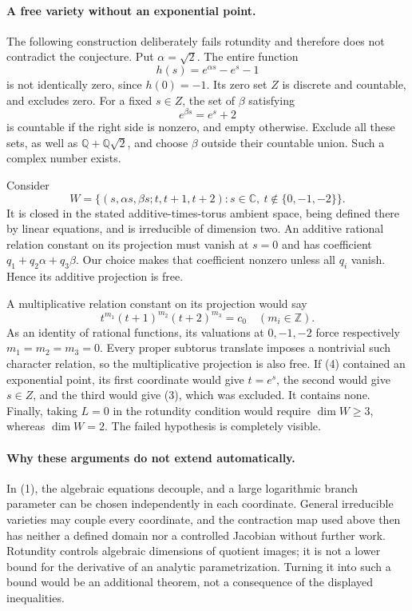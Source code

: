 \documentclass[11pt]{article}
\begin{document}
\paragraph{A free variety without an exponential point.}
The following construction deliberately fails rotundity and therefore
does not contradict the conjecture. Put $\alpha=\sqrt2$. The entire
function
\[
 h(s)=e^{\alpha s}-e^s-1
\]
is not identically zero, since $h(0)=-1$. Its zero set $Z$ is discrete
and countable, and excludes zero. For a fixed $s\in Z$, the set of
$\beta$ satisfying
\[
 e^{\beta s}=e^s+2                                      \tag{3}
\]
is countable if the right side is nonzero, and empty otherwise. Exclude
all these sets, as well as $\mathbb Q+\mathbb Q\sqrt2$, and choose
$\beta$ outside their countable union. Such a complex number exists.

Consider
\[
 W=\{(s,\alpha s,\beta s;t,t+1,t+2):
 s\in\mathbb C,\ t\notin\{0,-1,-2\}\}.
                                                        \tag{4}
\]
It is closed in the stated additive-times-torus ambient space, being
defined there by linear equations, and is irreducible of dimension two.
An additive rational relation constant on its projection must vanish at
$s=0$ and has coefficient $q_1+q_2\alpha+q_3\beta$. Our choice makes
that coefficient nonzero unless all $q_i$ vanish. Hence its additive
projection is free.

A multiplicative relation constant on its projection would say
\[
 t^{m_1}(t+1)^{m_2}(t+2)^{m_3}=c_0
 \quad(m_i\in\mathbb Z).
\]
As an identity of rational functions, its valuations at $0,-1,-2$
force respectively $m_1=m_2=m_3=0$. Every proper subtorus translate
imposes a nontrivial such character relation, so the multiplicative
projection is also free. If (4) contained an exponential point, its
first coordinate would give $t=e^s$, the second would give $s\in Z$,
and the third would give (3), which was excluded. It contains none.
Finally, taking $L=0$ in the rotundity condition would require
$\dim W\ge3$, whereas $\dim W=2$. The failed hypothesis is completely
visible.

\paragraph{Why these arguments do not extend automatically.}
In (1), the algebraic equations decouple, and a large logarithmic branch
parameter can be chosen independently in each coordinate. General
irreducible varieties may couple every coordinate, and the contraction
map used above then has neither a defined domain nor a controlled
Jacobian without further work. Rotundity controls algebraic dimensions
of quotient images; it is not a lower bound for the derivative of an
analytic parametrization. Turning it into such a bound would be an
additional theorem, not a consequence of the displayed inequalities.
\end{document}
